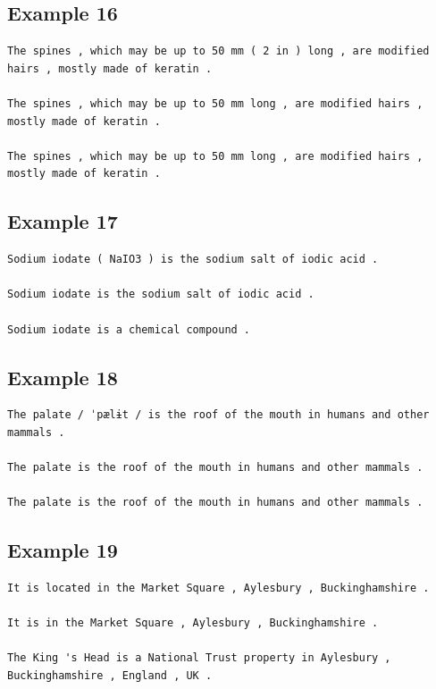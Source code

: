 \documentclass[11pt,twocolumn]{article}
\begin{document}
\subsection*{Example 16}
\label{app:16}
\begin{Verbatim}[fontsize=\scriptsize]
The spines , which may be up to 50 mm ( 2 in ) long , are modified hairs , mostly made of keratin .

The spines , which may be up to 50 mm long , are modified hairs , mostly made of keratin .

The spines , which may be up to 50 mm long , are modified hairs , mostly made of keratin .
\end{Verbatim}

\subsection*{Example 17}
\label{app:17}
\begin{Verbatim}[fontsize=\scriptsize]
Sodium iodate ( NaIO3 ) is the sodium salt of iodic acid .

Sodium iodate is the sodium salt of iodic acid .

Sodium iodate is a chemical compound .
\end{Verbatim}

\subsection*{Example 18}
\label{app:18}
\begin{Verbatim}[fontsize=\scriptsize]
The palate / ˈpælɨt / is the roof of the mouth in humans and other mammals .

The palate is the roof of the mouth in humans and other mammals .

The palate is the roof of the mouth in humans and other mammals .
\end{Verbatim}

\subsection*{Example 19}
\label{app:19}
\begin{Verbatim}[fontsize=\scriptsize]
It is located in the Market Square , Aylesbury , Buckinghamshire .

It is in the Market Square , Aylesbury , Buckinghamshire .

The King 's Head is a National Trust property in Aylesbury , Buckinghamshire , England , UK .
\end{Verbatim}
\end{document}
